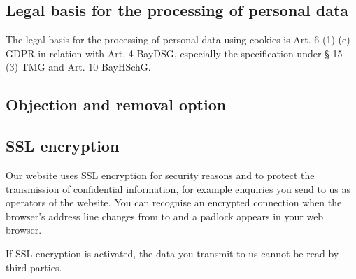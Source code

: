 \documentclass[letterpaper,10pt,english]{sphinxmanual}
\begin{document}
\subsection{Legal basis for the processing of personal data}
\label{\detokenize{policies/privacy:id9}}
\sphinxAtStartPar
The legal basis for the processing of personal data using cookies is Art. 6 (1) (e) GDPR in relation with Art. 4 BayDSG, especially the specification under \S{} 15 (3) TMG and Art. 10 BayHSchG.


\subsection{Objection and removal option}
\label{\detokenize{policies/privacy:objection-and-removal-option}}

\subsection{SSL encryption}
\label{\detokenize{policies/privacy:ssl-encryption}}
\sphinxAtStartPar
Our website uses SSL encryption for security reasons and to protect the transmission of confidential information, for example enquiries you send to us as operators of the website. You can recognise an encrypted connection when the browser’s address line changes from  to  and a padlock appears in your web browser.

\sphinxAtStartPar
If SSL encryption is activated, the data you transmit to us cannot be read by third parties.
\end{document}
